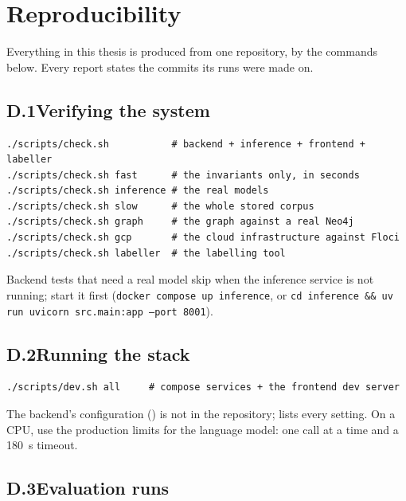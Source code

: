 
\chapter{Reproducibility}
\label{app:reproducibility}

Everything in this thesis is produced from one repository, by the
commands below. Every report states the commits its runs were made on.

\section*{D.1\quad Verifying the system}

\begin{lstlisting}
./scripts/check.sh           # backend + inference + frontend + labeller
./scripts/check.sh fast      # the invariants only, in seconds
./scripts/check.sh inference # the real models
./scripts/check.sh slow      # the whole stored corpus
./scripts/check.sh graph     # the graph against a real Neo4j
./scripts/check.sh gcp       # the cloud infrastructure against Floci
./scripts/check.sh labeller  # the labelling tool
\end{lstlisting}

Backend tests that need a real model skip when the inference service is
not running; start it first (\texttt{docker compose up inference}, or
\texttt{cd inference \&\& uv run uvicorn src.main:app --port 8001}).

\section*{D.2\quad Running the stack}

\begin{lstlisting}
./scripts/dev.sh all     # compose services + the frontend dev server
\end{lstlisting}

The backend's configuration () is not in the
repository;  lists every setting. On a CPU,
use the production limits for the language model: one call at a time
and a 180~s timeout.

\section*{D.3\quad Evaluation runs}

